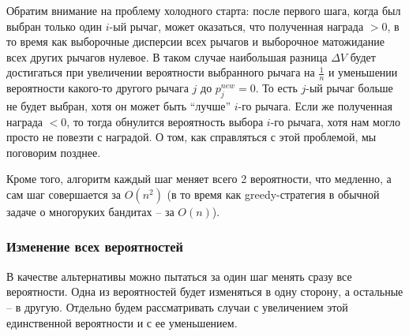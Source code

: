 Обратим внимание на проблему холодного старта: после первого шага, когда был выбран только один $i$-ый рычаг, может оказаться, что полученная награда $> 0$, в то время как выборочные дисперсии всех рычагов и выборочное матожидание всех других рычагов нулевое. В таком случае наибольшая разница $\Delta V$ будет достигаться при увеличении вероятности выбранного рычага на $\frac{1}{n}$ и уменьшении вероятности какого-то другого рычага $j$ до $p_j^{new} = 0$. То есть $j$-ый рычаг больше не будет выбран, хотя он может быть ``лучше'' $i$-го рычага. Если же полученная награда $< 0$, то тогда обнулится вероятность выбора $i$-го рычага, хотя нам могло просто не повезти с наградой. О том, как справляться с этой проблемой, мы поговорим позднее.

Кроме того, алгоритм каждый шаг меняет всего 2 вероятности, что медленно, а сам шаг совершается за $O(n^2)$ (в то время как greedy-стратегия в обычной задаче о многоруких бандитах -- за $O(n)$).
    

\subsubsection{Изменение всех вероятностей}
\label{subsec:theory_iterative_change_all_probs}

В качестве альтернативы можно пытаться за один шаг менять сразу все вероятности. Одна из вероятностей будет изменяться в одну сторону, а остальные -- в другую. Отдельно будем рассматривать случаи с увеличением этой единственной вероятности и с ее уменьшением.
    
